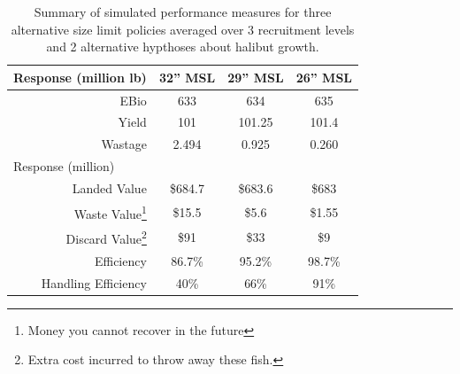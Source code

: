 \begin{table}
	\caption{Summary of simulated performance measures for three alternative size limit policies averaged over 3 recruitment levels and 2 alternative hypthoses about halibut growth.}
	\label{table:SizeLimit_SummaryTable}
	\begin{center}
		\begin{tabular}{r|c|c|c}
			\hline
			\multicolumn{1}{l}{{Response (million lb)}} & {32'' MSL} & {29'' MSL}  & {26'' MSL } \\
			\hline
			EBio       & 633     & 634      & 635    \\
			Yield      & 101     & 101.25   & 101.4  \\
			Wastage      & {2.494}   & {0.925}    & {0.260}  \\
			\hline
			\multicolumn{4}{l}{{Response (million)}}\\
			\hline
			Landed Value     & \$684.7 & \$683.6  & \$683  \\
			{Waste Value\footnote{Money you cannot recover in the future} }
			 & {\$15.5}&{\$5.6} &{\$1.55} \\
			Discard Value\footnote{Extra cost incurred to throw away these fish.}
			& \$91 & \$33 & \$9\\
			\hline 
			Efficiency & 86.7\%  & 95.2\% & 98.7\% \\
			Handling Efficiency & 40\% & 66\%  & 91\%\\
			\hline
		\end{tabular}
	\end{center}
\end{table}
















